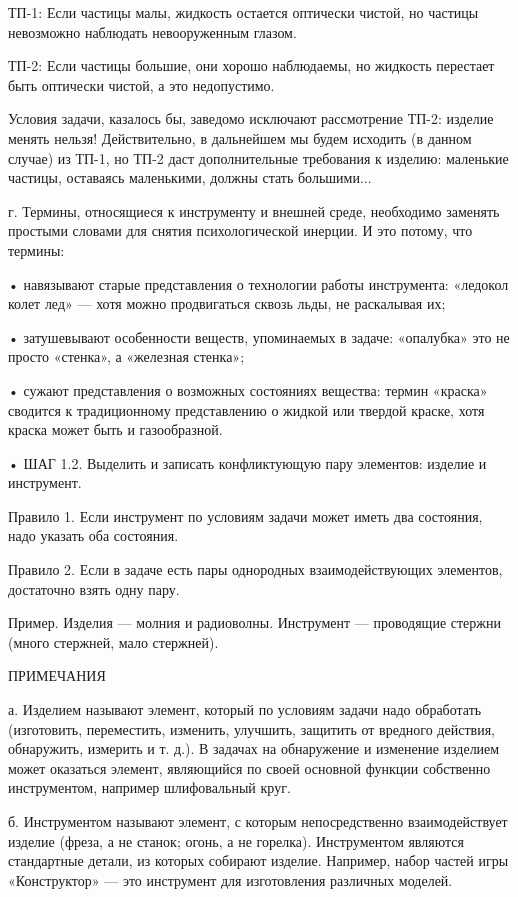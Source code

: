 ТП-1:  Если  частицы  малы,  жидкость остается  оптически  чистой,  но
частицы невозможно наблюдать невооруженным глазом.

ТП-2:  Если  частицы  большие,  они  хорошо  наблюдаемы,  но  жидкость
перестает быть оптически чистой, а это недопустимо.

Условия  задачи, казалось  бы, заведомо  исключают рассмотрение  ТП-2:
изделие менять  нельзя! Действительно, в дальнейшем  мы будем исходить
(в  данном случае)  из ТП-1,  но ТП-2  даст дополнительные  требования
к  изделию:  маленькие  частицы, оставаясь  маленькими,  должны  стать
большими...

г.  Термины, относящиеся  к  инструменту и  внешней среде,  необходимо
заменять простыми  словами для  снятия психологической инерции.  И это
потому, что термины:

•  навязывают старые  представления о  технологии работы  инструмента:
«ледокол  колет  лед»  —  хотя  можно  продвигаться  сквозь  льды,  не
раскалывая их;

• затушевывают  особенности веществ, упоминаемых в  задаче: «опалубка»
это не просто «стенка», а «железная стенка»;

•  сужают  представления  о   возможных  состояниях  вещества:  термин
«краска» сводится  к традиционному представлению о  жидкой или твердой
краске, хотя краска может быть и газообразной.


• ШАГ 1.2. Выделить и записать конфликтующую пару элементов: изделие и
инструмент.

Правило  1.  Если  инструмент  по  условиям  задачи  может  иметь  два
состояния, надо указать оба состояния.

Правило  2.  Если  в  задаче есть  пары  однородных  взаимодействующих
элементов, достаточно взять одну пару.

Пример. Изделия — молния и радиоволны. Инструмент — проводящие стержни
(много стержней, мало стержней).

ПРИМЕЧАНИЯ

а.  Изделием  называют  элемент,   который  по  условиям  задачи  надо
обработать  (изготовить,  переместить,  изменить,  улучшить,  защитить
от  вредного  действия,  обнаружить,  измерить и  т.  д.).  В  задачах
на  обнаружение   и  изменение   изделием  может   оказаться  элемент,
являющийся по своей основной функции собственно инструментом, например
шлифовальный круг.

б.   Инструментом   называют   элемент,  с   которым   непосредственно
взаимодействует изделие  (фреза, а  не станок;  огонь, а  не горелка).
Инструментом являются стандартные детали, из которых собирают изделие.
Например,  набор  частей  игры  «Конструктор»  —  это  инструмент  для
изготовления различных моделей.

